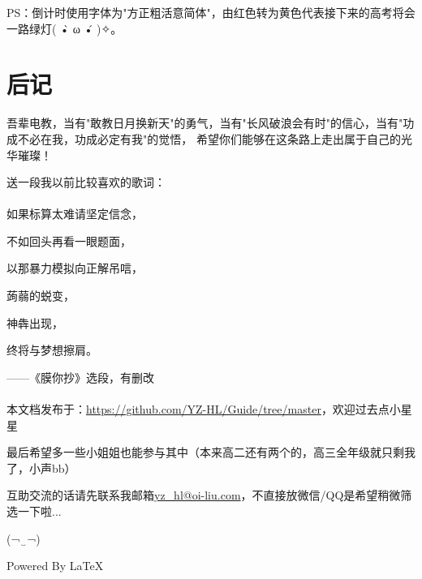 \documentclass[a5paper]{article}
\begin{document}
        PS：倒计时使用字体为"方正粗活意简体"，由红色转为黄色代表接下来的高考将会一路绿灯( •̀ ω •́ )✧。

    \newpage

    \section{后记}
        吾辈电教，当有"敢教日月换新天"的勇气，当有"长风破浪会有时"的信心，当有"功成不必在我，功成必定有我"的觉悟，
        希望你们能够在这条路上走出属于自己的光华璀璨！

        送一段我以前比较喜欢的歌词：\\ \\

        如果标算太难请坚定信念，

        不如回头再看一眼题面，
        
        以那暴力模拟向正解吊唁，
        
        蒟蒻的蜕变，
        
        神犇出现，
        
        终将与梦想擦肩。

        ——《膜你抄》选段，有删改 \\ \\

        本文档发布于：\url{https://github.com/YZ-HL/Guide/tree/master}，欢迎过去点小星星~~

        最后希望多一些小姐姐也能参与其中（本来高二还有两个的，高三全年级就只剩我了，小声bb）

        互助交流的话请先联系我邮箱\url{yz_hl@oi-liu.com}，不直接放微信/QQ是希望稍微筛选一下啦...

        (¬‿¬)

        Powered By \LaTeX
\end{document}
